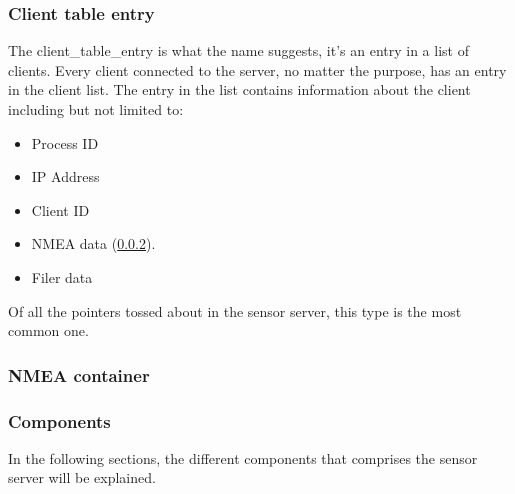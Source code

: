 \documentclass[12pt,english,a4paper]{report}
\begin{document}
\subsubsection{Client table entry}
The client\_table\_entry is what the name suggests, it's an entry in a list of clients. Every client connected to the server, no matter the purpose, has an entry in the client list. The entry in the list contains information about the client including but not limited to:
\begin{itemize}
  \item Process ID
  \item IP Address
  \item Client ID
  \item NMEA data (\ref{nmea_cont}).
  \item Filer data
\end{itemize}
Of all the pointers tossed about in the sensor server, this type is the most common one. 

\subsubsection{NMEA container}\label{nmea_cont}


\subsubsection{Components}
In the following sections, the different components that comprises the sensor server will be explained. 
\end{document}
